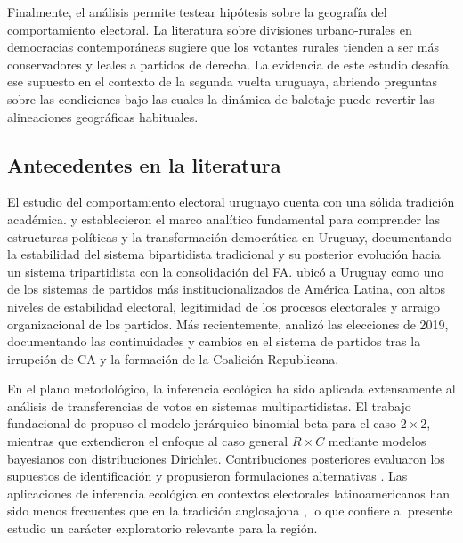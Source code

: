 Finalmente, el análisis permite testear hipótesis sobre la geografía del comportamiento electoral. La literatura sobre divisiones urbano-rurales en democracias contemporáneas \citep{rodden2019s, calvo2003local} sugiere que los votantes rurales tienden a ser más conservadores y leales a partidos de derecha. La evidencia de este estudio desafía ese supuesto en el contexto de la segunda vuelta uruguaya, abriendo preguntas sobre las condiciones bajo las cuales la dinámica de balotaje puede revertir las alineaciones geográficas habituales.

\subsection{Antecedentes en la literatura}

El estudio del comportamiento electoral uruguayo cuenta con una sólida tradición académica. \citet{gonzalez1991electoral} y \citet{gonzalez1993structuring} establecieron el marco analítico fundamental para comprender las estructuras políticas y la transformación democrática en Uruguay, documentando la estabilidad del sistema bipartidista tradicional y su posterior evolución hacia un sistema tripartidista con la consolidación del FA. \citet{mainwaring1995party} ubicó a Uruguay como uno de los sistemas de partidos más institucionalizados de América Latina, con altos niveles de estabilidad electoral, legitimidad de los procesos electorales y arraigo organizacional de los partidos. Más recientemente, \citet{bottinelli2021elecciones} analizó las elecciones de 2019, documentando las continuidades y cambios en el sistema de partidos tras la irrupción de CA y la formación de la Coalición Republicana.

En el plano metodológico, la inferencia ecológica ha sido aplicada extensamente al análisis de transferencias de votos en sistemas multipartidistas. El trabajo fundacional de \citet{king1997} propuso el modelo jerárquico binomial-beta para el caso $2 \times 2$, mientras que \citet{rosen2001bayesian} extendieron el enfoque al caso general $R \times C$ mediante modelos bayesianos con distribuciones Dirichlet. Contribuciones posteriores evaluaron los supuestos de identificación \citep{greiner2009rxc} y propusieron formulaciones alternativas \citep{imai2008bayesian}. Las aplicaciones de inferencia ecológica en contextos electorales latinoamericanos han sido menos frecuentes que en la tradición anglosajona \citep{calvo2003local}, lo que confiere al presente estudio un carácter exploratorio relevante para la región.

